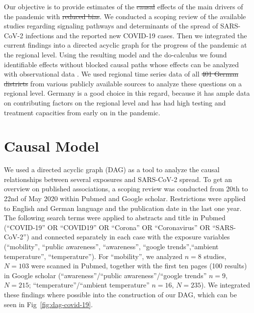 \documentclass[10pt,letterpaper]{article}
\providecommand{\DIFaddtex}[1]{{\protect\color{blue}\uwave{#1}}} %
\providecommand{\DIFdeltex}[1]{{\protect\color{red}\sout{#1}}}                      %
\providecommand{\DIFaddbegin}{} %
\providecommand{\DIFaddend}{} %
\providecommand{\DIFdelbegin}{} %
\providecommand{\DIFdelend}{} %
\providecommand{\DIFadd}[1]{\texorpdfstring{\DIFaddtex{#1}}{#1}} %
\providecommand{\DIFdel}[1]{\texorpdfstring{\DIFdeltex{#1}}{}} %
\newcommand{\DIFscaledelfig}{0.5}
\newlength{\DIFdelgraphicswidth} %
\newlength{\DIFdelgraphicsheight} %
\newcommand{\DIFaddincludegraphics}[2][]{{\color{blue}\fbox{\DIFOincludegraphics[#1]{#2}}}} %
\newcommand{\DIFdelincludegraphics}[2][]{%
\sbox{\DIFdelgraphicsbox}{\DIFOincludegraphics[#1]{#2}}%
\settoboxwidth{\DIFdelgraphicswidth}{\DIFdelgraphicsbox} %
\settoboxtotalheight{\DIFdelgraphicsheight}{\DIFdelgraphicsbox} %
\scalebox{\DIFscaledelfig}{%
\parbox[b]{\DIFdelgraphicswidth}{\usebox{\DIFdelgraphicsbox}\\[-\baselineskip] \rule{\DIFdelgraphicswidth}{0em}}\llap{\resizebox{\DIFdelgraphicswidth}{\DIFdelgraphicsheight}{%
\setlength{\unitlength}{\DIFdelgraphicswidth}%
\begin{picture}(1,1)%
\thicklines\linethickness{2pt} %
{\color[rgb]{1,0,0}\put(0,0){\framebox(1,1){}}}%
{\color[rgb]{1,0,0}\put(0,0){\line( 1,1){1}}}%
{\color[rgb]{1,0,0}\put(0,1){\line(1,-1){1}}}%
\end{picture}%
}\hspace*{3pt}}} %
} %
\DeclareRobustCommand{\DIFaddbegin}{\DIFOaddbegin \let\includegraphics\DIFaddincludegraphics} %
\DeclareRobustCommand{\DIFaddend}{\DIFOaddend \let\includegraphics\DIFOincludegraphics} %
\DeclareRobustCommand{\DIFdelbegin}{\DIFOdelbegin \let\includegraphics\DIFdelincludegraphics} %
\DeclareRobustCommand{\DIFdelend}{\DIFOaddend \let\includegraphics\DIFOincludegraphics} %
\begin{document}
Our objective is to provide \DIFaddbegin \DIFadd{valid }\DIFaddend estimates of the \DIFdelbegin \DIFdel{causal }\DIFdelend effects of the main drivers of the pandemic with \DIFdelbegin \DIFdel{reduced bias}\DIFdelend \DIFaddbegin \DIFadd{a causal graph approach}\DIFaddend . We conducted a scoping review of the available studies regarding signaling pathways and determinants of the spread of SARS-CoV-2 infections and the reported new COVID-19 cases. Then we integrated the current findings into a directed acyclic graph for the progress of the pandemic at the regional level. Using the resulting model and the do-calculus we found identifiable effects without blocked causal paths whose effects can be analyzed with observational data \cite{Pearl_2014}. We used regional time series data of all \DIFdelbegin \DIFdel{401 German districts }\DIFdelend \DIFaddbegin \DIFadd{German districts (\(401\)) }\DIFaddend from various publicly available sources to analyze these questions on a regional level. Germany is a good choice in this regard, because it has ample data on contributing factors on the regional level and has had high testing and treatment capacities from early on in the pandemic.

\section*{Causal Model}\label{causal-model}

We used a directed acyclic graph (DAG)
\cite{schipf_directed_2011, textor_robust_2017} as a tool to analyze
the causal relationships between several exposures and SARS-CoV-2
spread. To get an overview on published associations, a scoping review
was conducted from 20th to 22nd of May 2020 within Pubmed and Google
scholar. Restrictions were applied to English and German language and
the publication date in the last one year. The following search terms
were applied to abstracts and title in Pubmed (``COVID-19'' OR
``COVID19'' OR ``Corona'' OR ``Coronavirus'' OR ``SARS-CoV-2'') and
connected separately in each case with the exposure variables
(``mobility'', ``public awareness'', ``awareness'', ``google
trends'',``ambient temperature'', ``temperature''). For ``mobility'', we
analyzed \(n=8\) studies, \(N=103\) were scanned in Pubmed, together
with the first ten pages (100 results) in Google scholar
(``awareness''/``public awareness''/``google trends'' \(n=9\),
\(N=215\); ``temperature''/``ambient temperature'' \(n=16\), \(N=235\)).
We integrated these findings where possible into the construction of our
DAG, which can be seen in Fig~\ref{fig:dag-covid-19}.
\end{document}

